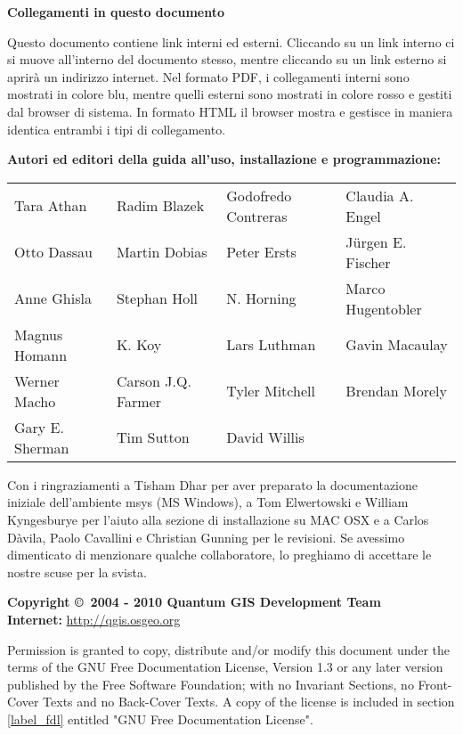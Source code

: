 \vspace{0.5cm}

\textbf{Collegamenti in questo documento}

Questo documento contiene link interni ed esterni. Cliccando su un
link interno ci si muove all'interno del documento stesso, mentre
cliccando su un link esterno si aprirà un indirizzo internet. Nel
formato PDF, i collegamenti interni sono mostrati in colore blu,
mentre quelli esterni sono mostrati in colore rosso e gestiti dal
browser di sistema. In formato HTML il browser mostra e gestisce in
maniera identica entrambi i tipi di collegamento.

\begin{flushleft}
\textbf{Autori ed editori della guida all'uso, installazione e programmazione:}

\begin{tabular}{p{4cm} p{4cm} p{4cm} p{4cm}}
Tara Athan & Radim Blazek & Godofredo Contreras & Claudia A. Engel \\
Otto Dassau & Martin Dobias & Peter Ersts & J\"urgen E. Fischer \\ 
Anne Ghisla & Stephan Holl & N. Horning & Marco Hugentobler \\ 
Magnus Homann & K. Koy & Lars Luthman & Gavin Macaulay \\
Werner Macho & Carson J.Q. Farmer & Tyler Mitchell & Brendan Morely \\
Gary E. Sherman & Tim Sutton & David Willis \\
\end{tabular}

Con i ringraziamenti a Tisham Dhar per aver preparato la documentazione
iniziale dell'ambiente msys (MS Windows), a Tom Elwertowski e William
Kyngesburye per l'aiuto alla sezione di installazione su MAC OSX e
a Carlos Dàvila, Paolo Cavallini e Christian Gunning per le revisioni.
Se avessimo dimenticato di menzionare qualche collaboratore, lo preghiamo
di accettare le nostre scuse per la svista.

\textbf{Copyright \copyright~2004 - 2010 Quantum GIS Development Team} \\
\textbf{Internet:} \url{http://qgis.osgeo.org}
\end{flushleft}

\newpage


Permission is granted to copy, distribute and/or modify this document under
the terms of the GNU Free Documentation License, Version 1.3 or any later
version published by the Free Software Foundation; with no Invariant
Sections, no Front-Cover Texts and no Back-Cover Texts.  A copy of the
license is included in section \ref{label_fdl} entitled "GNU Free Documentation
License".


